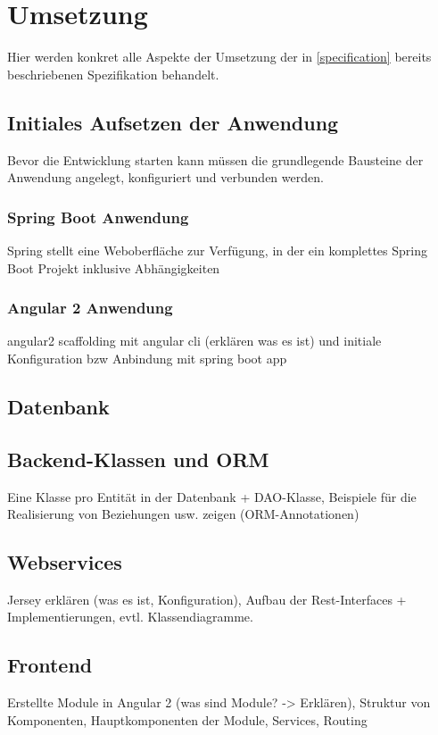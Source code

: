 \section{Umsetzung}
Hier werden konkret alle Aspekte der Umsetzung der in \cref{specification} bereits beschriebenen Spezifikation behandelt. %
 
\subsection{Initiales Aufsetzen der Anwendung}
Bevor die Entwicklung starten kann müssen die grundlegende Bausteine der Anwendung angelegt, konfiguriert und verbunden werden. 

\subsubsection{Spring Boot Anwendung}
Spring stellt eine Weboberfläche zur Verfügung, in der ein komplettes Spring Boot Projekt inklusive Abhängigkeiten 

\subsubsection{Angular 2 Anwendung}
angular2 scaffolding mit angular cli (erklären was es ist) und initiale Konfiguration bzw Anbindung mit spring boot app

\subsection{Datenbank}


\subsection{Backend-Klassen und ORM}
Eine Klasse pro Entität in der Datenbank + DAO-Klasse, Beispiele für die Realisierung von Beziehungen usw. zeigen (ORM-Annotationen)

\subsection{Webservices}
Jersey erklären (was es ist, Konfiguration), Aufbau der Rest-Interfaces + Implementierungen, evtl. Klassendiagramme. 

\subsection{Frontend}
Erstellte Module in Angular 2 (was sind Module? -> Erklären), Struktur von Komponenten, Hauptkomponenten der Module, Services, Routing